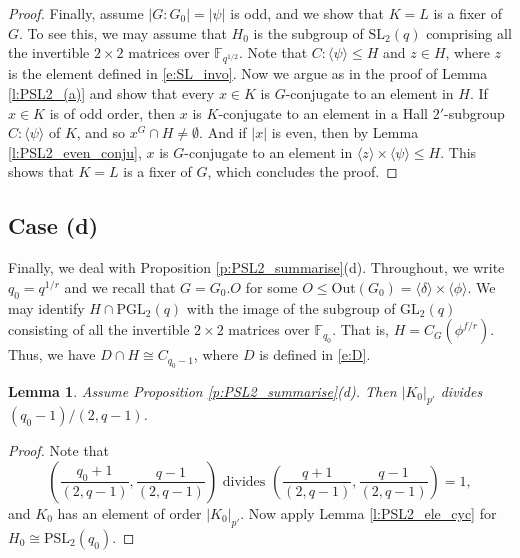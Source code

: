 \documentclass[twoside,a4paper,reqno,11pt]{amsart}
\newcommand{\<}{\langle}
\renewcommand{\>}{\rangle}
\newcommand{\la}{\langle}
\newcommand{\ra}{\rangle}
\newcommand{\leqs}{\leqslant}
\newcommand{\Out}{\mathrm{Out}}
\newcommand{\PSL}{\mathrm{PSL}}
\newcommand{\GL}{\mathrm{GL}}
\newcommand{\PGL}{\mathrm{PGL}}
\newcommand{\SL}{\mathrm{SL}}
\newtheorem{lem}[thm]{Lemma}
\theoremstyle{definition}
\begin{document}
\begin{proof}
		Finally, assume $|G:G_0| = |\psi|$ is odd, and we show that $K = L$ is a fixer of $G$. To see this, we may assume that $H_0$ is the subgroup of $\SL_2(q)$ comprising all the invertible $2\times 2$ matrices over $\mathbb{F}_{q^{1/2}}$. Note that $C{:}\la\psi\ra\leqs H$ and $z\in H$, where $z$ is the element defined in \eqref{e:SL_invo}. Now we argue as in the proof of Lemma \ref{l:PSL2_(a)} and show that every $x\in K$ is $G$-conjugate to an element in $H$. If $x\in K$ is of odd order, then $x$ is $K$-conjugate to an element in a Hall $2'$-subgroup $C{:}\la\psi\ra$ of $K$, and so $x^G\cap H\ne \emptyset$. And if $|x|$ is even, then by Lemma \ref{l:PSL2_even_conju}, $x$ is $G$-conjugate to an element in $\la z\ra\times\la\psi\ra\leqs H$. This shows that $K = L$ is a fixer of $G$, which concludes the proof.
	\end{proof}
	
	
	
	
	
	
	\subsection{Case (d)}
	
	Finally, we deal with Proposition \ref{p:PSL2_summarise}(d). Throughout, we write $q_0 = q^{1/r}$ and we recall that $G = G_0.O$ for some $O\leqs\Out(G_0) = \la\delta\ra\times\la\phi\ra$. We may identify $H\cap \PGL_2(q)$ with the image of the subgroup of $\GL_2(q)$ consisting of all the invertible $2\times 2$ matrices over $\mathbb{F}_{q_0}$. That is, $H = C_G(\phi^{f/r})$. Thus, we have $D\cap H\cong C_{q_0-1}$, where $D$ is defined in \eqref{e:D}.
	
	\begin{lem}
		\label{l:PSL2_(d)_q0}
		Assume Proposition \ref{p:PSL2_summarise}(d). Then $|K_0|_{p'}$ divides $(q_0-1)/(2,q-1)$.
	\end{lem}
	
	\begin{proof}
		Note that
		\begin{equation*}
		\left(\frac{q_0+1}{(2,q-1)},\frac{q-1}{(2,q-1)}\right)\text{ divides }\left(\frac{q+1}{(2,q-1)},\frac{q-1}{(2,q-1)}\right) = 1,
		\end{equation*}
		and $K_0$ has an element of order $|K_0|_{p'}$. Now apply Lemma \ref{l:PSL2_ele_cyc} for $H_0\cong\PSL_2(q_0)$.
	\end{proof}
	
	
	
\end{document}
